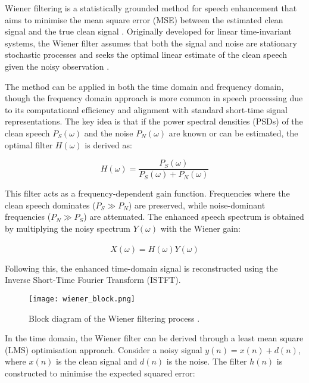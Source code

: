 Wiener filtering is a statistically grounded method for speech enhancement that aims to minimise the mean square error (MSE) between the estimated clean signal and the true clean signal \cite{loizou2013speech}. Originally developed for linear time-invariant systems, the Wiener filter assumes that both the signal and noise are stationary stochastic processes and seeks the optimal linear estimate of the clean speech given the noisy observation \cite{dubey2016evaluation}.

The method can be applied in both the time domain and frequency domain, though the frequency domain approach is more common in speech processing due to its computational efficiency and alignment with standard short-time signal representations. The key idea is that if the power spectral densities (PSDs) of the clean speech \(P_S(\omega)\) and the noise \(P_N(\omega)\) are known or can be estimated, the optimal filter \(H(\omega)\) is derived as:

\begin{equation}
    H(\omega) = \frac{P_S(\omega)}{P_S(\omega) + P_N(\omega)}
\end{equation}

This filter acts as a frequency-dependent gain function. Frequencies where the clean speech dominates (\(P_S \gg P_N\)) are preserved, while noise-dominant frequencies (\(P_N \gg P_S\)) are attenuated. The enhanced speech spectrum is obtained by multiplying the noisy spectrum \(Y(\omega)\) with the Wiener gain:

\begin{equation}
    \hat{X}(\omega) = H(\omega)Y(\omega)
\end{equation}

Following this, the enhanced time-domain signal is reconstructed using the Inverse Short-Time Fourier Transform (ISTFT).

\begin{figure}[h]
    \centering
    \texttt{[image: wiener\_block.png]}
    \caption{\label{fig:WienerBlock} Block diagram of the Wiener filtering process \cite{dubey2016evaluation}.}
\end{figure}

In the time domain, the Wiener filter can be derived through a least mean square (LMS) optimisation approach. Consider a noisy signal \( y(n) = x(n) + d(n) \), where \( x(n) \) is the clean signal and \( d(n) \) is the noise. The filter \( h(n) \) is constructed to minimise the expected squared error:

